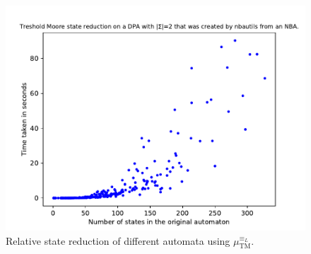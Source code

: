 \begin{figure}
\begin{minipage}{0.49\textwidth}
		\includegraphics[page=3,height=.3\textheight]{../data/analysis/threshold_moore/detnbaut_ap1.pdf} 
		\caption{Relative state reduction of different automata using $\mu_\text{TM}^{\equiv_L}$.}
		\label{fig:tremoore:empirical_reduct_rel}
	\end{minipage}
\end{figure}

